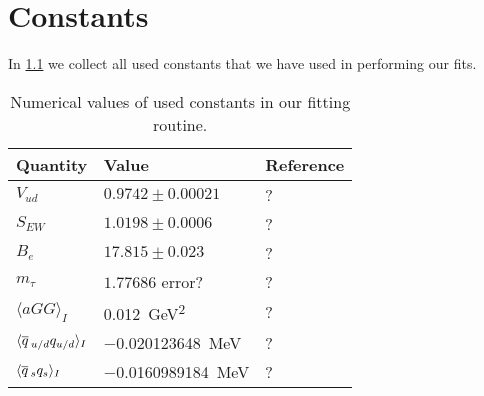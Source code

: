 \documentclass[../../index.tex]{subfiles}
\begin{document}
  \chapter{Constants}
  \label{ch:constants}
  In \cref{table:constants} we collect all used constants that we have used in
  performing our fits.
  \begin{table}[H]
    \centering
    \begin{tabular}{lll}
      \toprule
      Quantity & Value & Reference \\
      \midrule
      \(V_{ud}\) & \(0.9742 \pm 0.00021\) & ? \\
      \(S_{EW}\) & \(1.0198 \pm 0.0006\) & ? \\
      \(B_e\) & \(17.815 \pm 0.023\) & ? \\
      \(m_\tau\) & \(1.77686\) error? & ? \\
      \(\langle  a GG \rangle_I\) & \SI{0.012}{\giga\eV^2} & ? \\
      \(\langle \overline{q}\,_{u/d}q_{u/d} \rangle_I \) & \SI{-0.020123648}{\mega\eV} & ? \\
      \(\langle \overline{q}\,_{s}q_{s} \rangle_I \) & \SI{-0.0160989184}{\mega\eV} & ? \\
      \bottomrule
    \end{tabular}
    \caption{Numerical values of used constants in our fitting routine.}
    \label{table:constants}
  \end{table}


  

\end{document}
